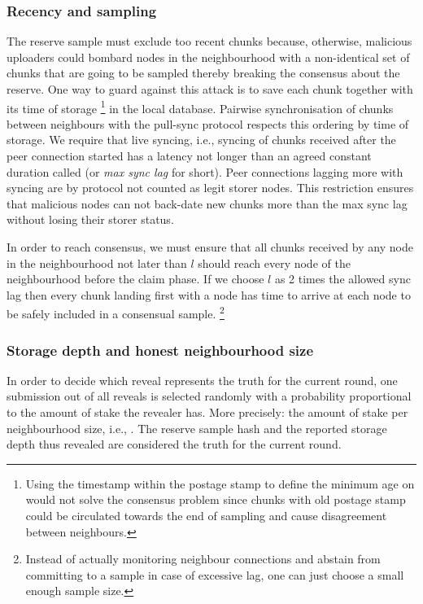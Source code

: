 \subsubsection{Recency and sampling}

The reserve sample must exclude too recent chunks because, otherwise, malicious uploaders could bombard nodes in the neighbourhood with a non-identical set of chunks  that are going to be sampled thereby breaking the consensus about the reserve. One way to guard against this attack is to save each chunk together with its time of storage%
%
\footnote{Using the timestamp within the postage stamp to define the minimum age on would not solve the consensus problem since chunks with old postage stamp could be circulated towards the end of sampling and cause disagreement between neighbours.}
% 
in the local database.
Pairwise synchronisation of chunks between neighbours with the pull-sync protocol respects this ordering by time of storage. 
We require that live syncing, i.e., syncing of chunks received after the peer connection started has a latency not longer than an agreed constant duration called  (or \emph{max sync lag} for short). Peer connections lagging more with syncing are by protocol not counted as legit storer nodes. This restriction ensures that malicious nodes can not back-date new chunks more than the max sync lag without losing their storer status. 

In order to reach consensus, we must ensure that all chunks received by any node in the neighbourhood not later than $l$ should reach every node of the neighbourhood before the claim phase.
%
If we choose $l$ as 2 times the allowed sync lag then every chunk landing first with a node has time to arrive at each node to be safely included in a consensual sample.%
%
\footnote{Instead of actually monitoring neighbour connections and abstain from committing to a sample in case of excessive lag, one can just choose a small enough sample size.}%
%

\subsubsection{Storage depth and honest neighbourhood size}

In order to decide which reveal represents the truth for the current round, one submission out of all reveals is selected randomly with a probability proportional to the amount of stake the revealer has. More precisely: the amount of stake per neighbourhood size, i.e.,    . The reserve sample hash and the reported storage depth thus revealed are considered the truth for the current round. 

